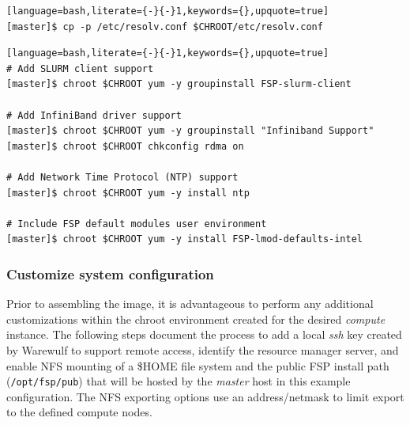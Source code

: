\documentclass[letterpaper]{article}
\begin{document}
\begin{lstlisting}[language=bash,literate={-}{-}1,keywords={},upquote=true]
[master]$ cp -p /etc/resolv.conf $CHROOT/etc/resolv.conf
\end{lstlisting}


\begin{lstlisting}[language=bash,literate={-}{-}1,keywords={},upquote=true]
# Add SLURM client support
[master]$ chroot $CHROOT yum -y groupinstall FSP-slurm-client

# Add InfiniBand driver support
[master]$ chroot $CHROOT yum -y groupinstall "Infiniband Support"
[master]$ chroot $CHROOT chkconfig rdma on

# Add Network Time Protocol (NTP) support
[master]$ chroot $CHROOT yum -y install ntp

# Include FSP default modules user environment
[master]$ chroot $CHROOT yum -y install FSP-lmod-defaults-intel
\end{lstlisting}

\subsubsection{Customize system configuration} \label{sec:master_customization}

Prior to assembling the image, it is advantageous to perform any additional
customizations within the chroot environment created for the desired {\em
  compute} instance. The following steps document the process to add a local
{\em ssh} key created by Warewulf to support remote access, identify the
resource manager server, and enable NFS mounting of a \$HOME file system and
the public FSP install path (\texttt{/opt/fsp/pub}) that will be hosted by the
{\em master} host in this example configuration.  The NFS exporting options use
an address/netmask to limit export to the defined compute nodes.

\end{document}
